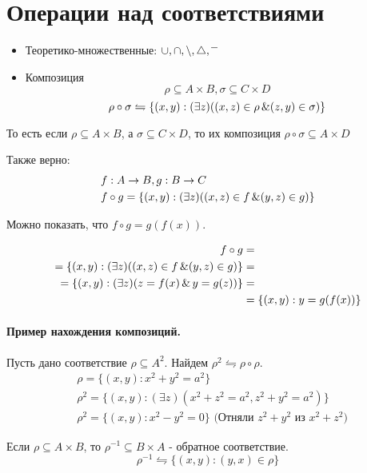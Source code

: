 \section{Операции над соответствиями}

\begin{itemize}
	\item Теоретико-множественные: $ \cup, \cap, \setminus, \operatorname{\triangle}, \overline{\phantom{x}}$ 
	\item Композиция \[
	\rho \subseteq A\times B, \sigma \subseteq C\times D
	\] 
	\[
	\rho \circ \sigma \leftrightharpoons \{(x,y):(\exists z)((x,z) \in \rho\operatorname{\&}(z,y)\in \sigma)\} 
	\] 
\end{itemize}

То есть если $\rho \subseteq A\times B$, а $\sigma \subseteq C\times D$, то их композиция
$\rho \circ \sigma \subseteq A\times D$

\medskip

Также верно:
\begin{align*}
	&f:A \to B, g:B \to C \\
	&f \circ g = \{(x,y):(\exists z)((x,z)\in f \operatorname{\&} (y,z)\in g)\}
\end{align*}

Можно показать, что $f \circ g = g(f(x))$.
\begin{myproof}
\begin{align*}
	f \circ g &= \\
	= \{(x,y):(\exists z)((x,z)\in f \operatorname{\&} (y,z)\in g)\}&= \\
	= \{(x,y):(\exists z)(z=f(x) \operatorname{\&} y=g(z))\} &= \\
						     &= \{(x,y):y=g(f(x))\}  
\end{align*}
\end{myproof}

\medskip

\paragraph*{Пример нахождения композиций.}
Пусть дано соответствие $\rho \subseteq A^2$. Найдем $\rho^2 \leftrightharpoons \rho \circ \rho$.
\begin{align*}
	&\rho = \{(x,y):x^2+y^2=a^2\} \\
	&\rho^2 = \{(x,y):(\exists z)(x^2+z^2=a^2, z^2+y^2=a^2)\} \\
	&\rho^2 = \{(x,y):x^2-y^2=0\}\text{ (Отняли $z^2+y^2$ из $x^2+z^2$)}
\end{align*}

\begin{definition}
Если $\rho \subseteq A\times B$, то $\rho^{-1} \subseteq B\times A$ - обратное соответствие. \[
\rho^{-1} \leftrightharpoons \{(x,y):(y,x) \in \rho\} 
\] 
\end{definition}

